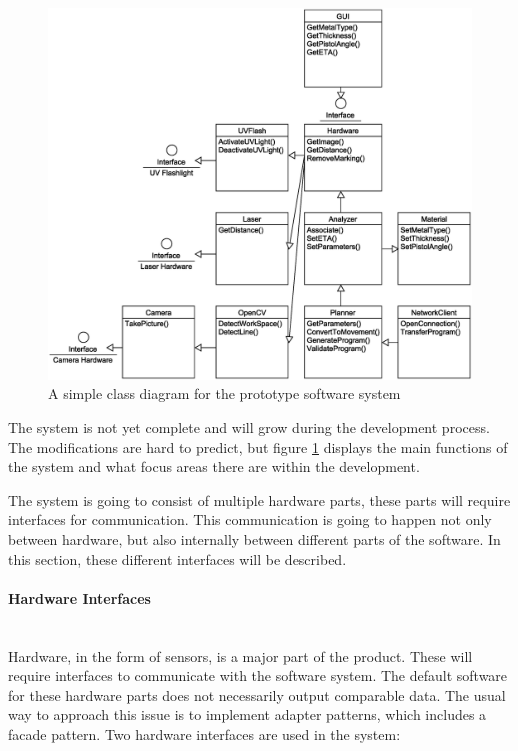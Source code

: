 \begin{figure}[h!]
\centering
\includegraphics[width=\textwidth]{graphics/Prototype}
\caption{A simple class diagram for the prototype software system}
\label{ClassDiagram}
\end{figure}

The system is not yet complete and will grow during the development process. The modifications are hard to predict, but figure \ref{ClassDiagram} displays the main functions of the system and what focus areas there are within the development. 

The system is going to consist of multiple hardware parts, these parts will require interfaces for communication. This communication is going to happen not only between hardware, but also internally between different parts of the software.
In this section, these different interfaces will be described. 

\paragraph*{Hardware Interfaces}~\\
Hardware, in the form of sensors, is a major part of the product. These will require interfaces to communicate with the software system. The default software for these hardware parts does not necessarily output comparable data. The usual way to approach this issue is to implement adapter patterns, which includes a facade pattern. Two hardware interfaces are used in the system:

